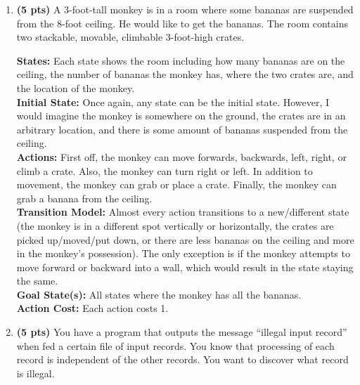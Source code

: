 \documentclass{article}
\begin{document}
\begin{enumerate}
\begin{enumerate}[label=($\alph*$)]

    \item \textbf{(5 pts)} A 3-foot-tall monkey is in a room where some bananas are suspended from the 8-foot ceiling. He would like to get the bananas. The room contains two stackable, movable, climbable 3-foot-high crates.

    \color{blue}
        \textbf{States:} Each state shows the room including how many bananas are on the ceiling, the number of bananas the monkey has, where the two crates are, and the location of the monkey. \\
        \textbf{Initial State:} Once again, any state can be the initial state. However, I would imagine the monkey is somewhere on the ground, the crates are in an arbitrary location, and there is some amount of bananas suspended from the ceiling. \\
        \textbf{Actions:} First off, the monkey can move forwards, backwards, left, right, or climb a crate. Also, the monkey can turn right or left. In addition to movement, the monkey can grab or place a crate. Finally, the monkey can grab a banana from the ceiling. \\
        \textbf{Transition Model:} Almost every action transitions to a new/different state (the monkey is in a different spot vertically or horizontally, the crates are picked up/moved/put down, or there are less bananas on the ceiling and more in the monkey's possession). The only exception is if the monkey attempts to move forward or backward into a wall, which would result in the state staying the same. \\
        \textbf{Goal State(s):} All states where the monkey has all the bananas. \\
        \textbf{Action Cost:} Each action costs 1.
    \color{black}



    \item \textbf{(5 pts)} You have a program that outputs the message “illegal input record” when fed a certain file of input records. You know that processing of each record is independent of the other records. You want to discover what record is illegal.


\end{enumerate}
\end{enumerate}
\end{document}
